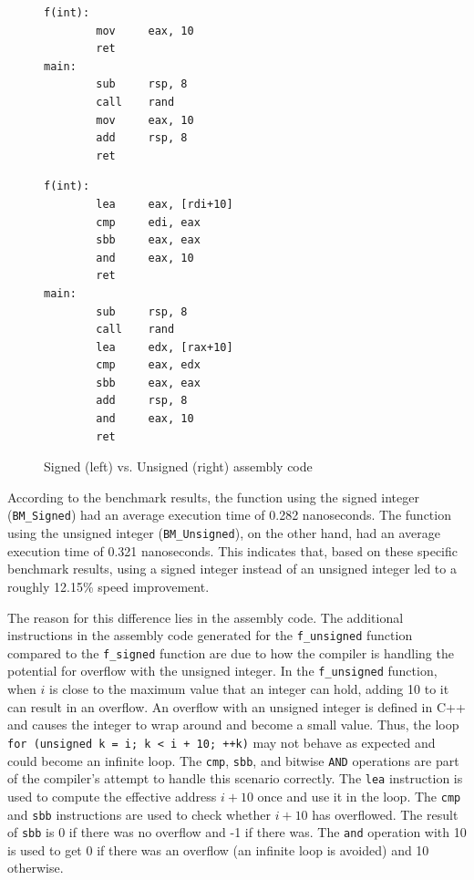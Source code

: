 \documentclass{article}
\theoremstyle{break}
\begin{document}
\begin{figure}[ht]
\begin{minipage}{0.45\textwidth}

\begin{lstlisting}
f(int):
        mov     eax, 10
        ret
main:
        sub     rsp, 8
        call    rand
        mov     eax, 10
        add     rsp, 8
        ret
\end{lstlisting}
\end{minipage}\hfill
\begin{minipage}{0.45\textwidth}

\begin{lstlisting}
f(int):
        lea     eax, [rdi+10]
        cmp     edi, eax
        sbb     eax, eax
        and     eax, 10
        ret
main:
        sub     rsp, 8
        call    rand
        lea     edx, [rax+10]
        cmp     eax, edx
        sbb     eax, eax
        add     rsp, 8
        and     eax, 10
        ret
\end{lstlisting}
\end{minipage}
\caption{Signed (left) vs. Unsigned (right) assembly code}
\end{figure}
According to the benchmark results, the function using the signed integer (\texttt{BM\_Signed}) had an average execution time of 0.282 nanoseconds. The function using the unsigned integer (\texttt{BM\_Unsigned}), on the other hand, had an average execution time of 0.321 nanoseconds. This indicates that, based on these specific benchmark results, using a signed integer instead of an unsigned integer led to a roughly 12.15\% speed improvement.

The reason for this difference lies in the assembly code. The additional instructions in the assembly code generated for the \texttt{f\_unsigned} function compared to the \texttt{f\_signed} function are due to how the compiler is handling the potential for overflow with the unsigned integer. In the \texttt{f\_unsigned} function, when \(i\) is close to the maximum value that an integer can hold, adding 10 to it can result in an overflow. An overflow with an unsigned integer is defined in C++ and causes the integer to wrap around and become a small value. Thus, the loop \texttt{for (unsigned k = i; k < i + 10; ++k)} may not behave as expected and could become an infinite loop. The \texttt{cmp}, \texttt{sbb}, and bitwise \texttt{AND} operations are part of the compiler's attempt to handle this scenario correctly. The \texttt{lea} instruction is used to compute the effective address \(i + 10\) once and use it in the loop. The \texttt{cmp} and \texttt{sbb} instructions are used to check whether \(i + 10\) has overflowed. The result of \texttt{sbb} is 0 if there was no overflow and -1 if there was. The \texttt{and} operation with 10 is used to get 0 if there was an overflow (an infinite loop is avoided) and 10 otherwise.
\end{document}
